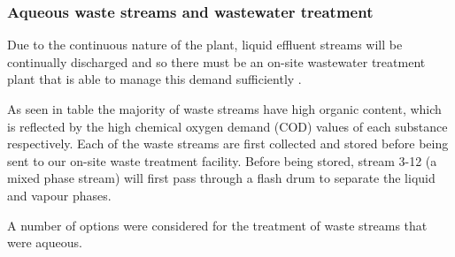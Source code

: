 \subsubsection{Aqueous waste streams and wastewater treatment}

Due to the continuous nature of the plant, liquid effluent streams will be continually discharged and so there must be an on-site wastewater treatment plant that is able to manage this demand sufficiently \cite{water_innovations_inc_continuous_2021}.  

As seen in table %
the majority of waste streams have high organic content, which is reflected by the high chemical oxygen demand (COD) values of each substance respectively. Each of the waste streams are first collected and stored before being sent to our on-site waste treatment facility. Before being stored, stream 3-12 (a mixed phase stream) will first pass through a flash drum to separate the liquid and vapour phases. 

A number of options were considered for the treatment of waste streams that were aqueous. 

